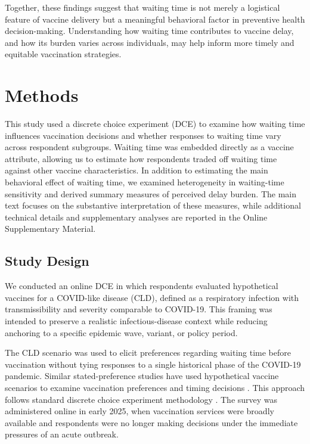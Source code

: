 \documentclass[12pt]{article}
\begin{document}
Together, these findings suggest that waiting time is not merely a logistical feature of vaccine delivery but a meaningful behavioral factor in preventive health decision-making. Understanding how waiting time contributes to vaccine delay, and how its burden varies across individuals, may help inform more timely and equitable vaccination strategies.


\section{Methods}\label{sec:methods}

This study used a discrete choice experiment (DCE) to examine how waiting time influences vaccination decisions and whether responses to waiting time vary across respondent subgroups. Waiting time was embedded directly as a vaccine attribute, allowing us to estimate how respondents traded off waiting time against other vaccine characteristics. In addition to estimating the main behavioral effect of waiting time, we examined heterogeneity in waiting-time sensitivity and derived summary measures of perceived delay burden. The main text focuses on the substantive interpretation of these measures, while additional technical details and supplementary analyses are reported in the Online Supplementary Material.

\subsection{Study Design}

We conducted an online DCE in which respondents evaluated hypothetical vaccines for a COVID-like disease (CLD), defined as a respiratory infection with transmissibility and severity comparable to COVID-19. This framing was intended to preserve a realistic infectious-disease context while reducing anchoring to a specific epidemic wave, variant, or policy period.

The CLD scenario was used to elicit preferences regarding waiting time before vaccination without tying responses to a single historical phase of the COVID-19 pandemic. Similar stated-preference studies have used hypothetical vaccine scenarios to examine vaccination preferences and timing decisions \parencite{Gong2020}. This approach follows standard discrete choice experiment methodology \parencite{Louviere2000,Hensher2015,Johnson2013}. The survey was administered online in early 2025, when vaccination services were broadly available and respondents were no longer making decisions under the immediate pressures of an acute outbreak.
\end{document}
